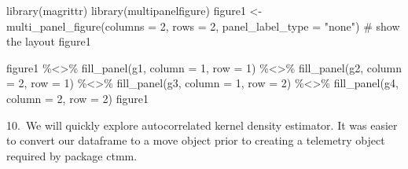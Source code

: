 \documentclass[
  letterpaper,
]{book}
\newenvironment{Shaded}{\begin{snugshade}}{\end{snugshade}}
\newcommand{\AttributeTok}[1]{\textcolor[rgb]{0.40,0.45,0.13}{#1}}
\newcommand{\CommentTok}[1]{\textcolor[rgb]{0.37,0.37,0.37}{#1}}
\newcommand{\DecValTok}[1]{\textcolor[rgb]{0.68,0.00,0.00}{#1}}
\newcommand{\FunctionTok}[1]{\textcolor[rgb]{0.28,0.35,0.67}{#1}}
\newcommand{\NormalTok}[1]{\textcolor[rgb]{0.00,0.23,0.31}{#1}}
\newcommand{\OtherTok}[1]{\textcolor[rgb]{0.00,0.23,0.31}{#1}}
\newcommand{\SpecialCharTok}[1]{\textcolor[rgb]{0.37,0.37,0.37}{#1}}
\newcommand{\StringTok}[1]{\textcolor[rgb]{0.13,0.47,0.30}{#1}}
\begin{document}
\begin{Shaded}
\begin{Highlighting}[]
\FunctionTok{library}\NormalTok{(magrittr)}
\FunctionTok{library}\NormalTok{(multipanelfigure)}
\NormalTok{figure1 }\OtherTok{\textless{}{-}} \FunctionTok{multi\_panel\_figure}\NormalTok{(}\AttributeTok{columns =} \DecValTok{2}\NormalTok{, }\AttributeTok{rows =} \DecValTok{2}\NormalTok{, }\AttributeTok{panel\_label\_type =} \StringTok{"none"}\NormalTok{)}
\CommentTok{\# show the layout}
\NormalTok{figure1}

\NormalTok{figure1 }\SpecialCharTok{\%\textless{}\textgreater{}\%}
  \FunctionTok{fill\_panel}\NormalTok{(g1, }\AttributeTok{column =} \DecValTok{1}\NormalTok{, }\AttributeTok{row =} \DecValTok{1}\NormalTok{) }\SpecialCharTok{\%\textless{}\textgreater{}\%}
  \FunctionTok{fill\_panel}\NormalTok{(g2, }\AttributeTok{column =} \DecValTok{2}\NormalTok{, }\AttributeTok{row =} \DecValTok{1}\NormalTok{) }\SpecialCharTok{\%\textless{}\textgreater{}\%}
  \FunctionTok{fill\_panel}\NormalTok{(g3, }\AttributeTok{column =} \DecValTok{1}\NormalTok{, }\AttributeTok{row =} \DecValTok{2}\NormalTok{) }\SpecialCharTok{\%\textless{}\textgreater{}\%}
  \FunctionTok{fill\_panel}\NormalTok{(g4, }\AttributeTok{column =} \DecValTok{2}\NormalTok{, }\AttributeTok{row =} \DecValTok{2}\NormalTok{)}
\NormalTok{figure1}
\end{Highlighting}
\end{Shaded}

10.~We will quickly explore autocorrelated kernel density estimator. It
was easier to convert our dataframe to a move object prior to creating a
telemetry object required by package ctmm.
\end{document}
